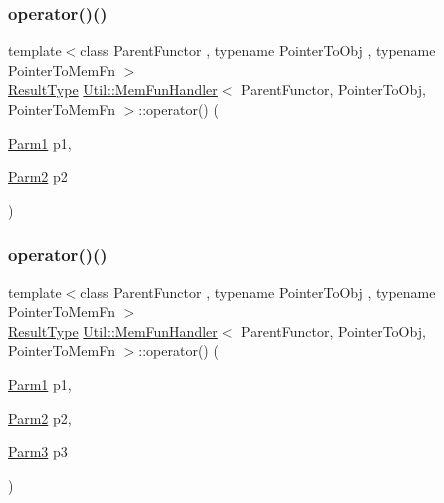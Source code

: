 \subsubsection{\texorpdfstring{operator()()}{operator()()}\hspace{0.1cm}{\footnotesize\ttfamily [9/18]}}
{\footnotesize\ttfamily template$<$class Parent\+Functor , typename Pointer\+To\+Obj , typename Pointer\+To\+Mem\+Fn $>$ \\
\mbox{\hyperlink{classUtil_1_1MemFunHandler_a093690dcced95ad48c5429e50006c83e}{Result\+Type}} \mbox{\hyperlink{classUtil_1_1MemFunHandler}{Util\+::\+Mem\+Fun\+Handler}}$<$ Parent\+Functor, Pointer\+To\+Obj, Pointer\+To\+Mem\+Fn $>$\+::operator() (\begin{DoxyParamCaption}\item[{\mbox{\hyperlink{classUtil_1_1MemFunHandler_a43182733677fc623d89e5613ecf15761}{Parm1}}}]{p1,  }\item[{\mbox{\hyperlink{classUtil_1_1MemFunHandler_a9d454c62047cb4bff3173b5bda9a38c8}{Parm2}}}]{p2 }\end{DoxyParamCaption})\hspace{0.3cm}{\ttfamily [inline]}}

\mbox{\label{classUtil_1_1MemFunHandler_ae5a7b0421e77aa263c762df15c043ea4}} 
\subsubsection{\texorpdfstring{operator()()}{operator()()}\hspace{0.1cm}{\footnotesize\ttfamily [10/18]}}
{\footnotesize\ttfamily template$<$class Parent\+Functor , typename Pointer\+To\+Obj , typename Pointer\+To\+Mem\+Fn $>$ \\
\mbox{\hyperlink{classUtil_1_1MemFunHandler_a093690dcced95ad48c5429e50006c83e}{Result\+Type}} \mbox{\hyperlink{classUtil_1_1MemFunHandler}{Util\+::\+Mem\+Fun\+Handler}}$<$ Parent\+Functor, Pointer\+To\+Obj, Pointer\+To\+Mem\+Fn $>$\+::operator() (\begin{DoxyParamCaption}\item[{\mbox{\hyperlink{classUtil_1_1MemFunHandler_a43182733677fc623d89e5613ecf15761}{Parm1}}}]{p1,  }\item[{\mbox{\hyperlink{classUtil_1_1MemFunHandler_a9d454c62047cb4bff3173b5bda9a38c8}{Parm2}}}]{p2,  }\item[{\mbox{\hyperlink{classUtil_1_1MemFunHandler_a6cbef94d16f4d6b29d6a8a90afbeff4f}{Parm3}}}]{p3 }\end{DoxyParamCaption})\hspace{0.3cm}{\ttfamily [inline]}}

